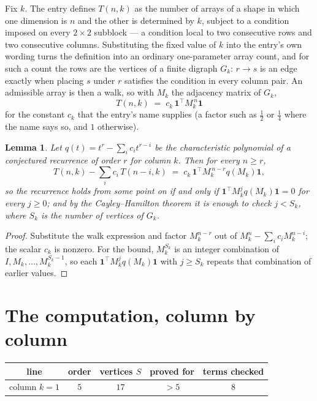 \documentclass[11pt,a4paper]{article}
\theoremstyle{plain}
\newtheorem{lemma}[theorem]{Lemma}
\theoremstyle{definition}
\begin{document}
Fix $k$. The entry defines $T(n,k)$ as the number of arrays of a shape in which one dimension
is $n$ and the other is determined by $k$, subject to a condition imposed on every
$2\times2$ subblock --- a condition local to two consecutive rows and two consecutive columns.
Substituting the fixed value of $k$ into the entry's own wording turns the definition into an
ordinary one-parameter array count, and for such a count the rows are the vertices of a finite
digraph $G_k$: $r\to s$ is an edge exactly when placing $s$ under $r$ satisfies the condition
in every column pair. An admissible array is then a walk, so with $M_k$ the adjacency matrix
of $G_k$,
\[
T(n,k)\;=\;c_k\,\mathbf{1}^{\!\top}M_k^{\,n}\mathbf{1}
\]
for the constant $c_k$ that the entry's name supplies (a factor such as $\tfrac12$ or
$\tfrac14$ where the name says so, and $1$ otherwise).

\begin{lemma}\label{lem:crit}
Let $q(t)=t^{r}-\sum_i c_it^{r-i}$ be the characteristic polynomial of a conjectured
recurrence of order $r$ for column $k$. Then for every $n\ge r$,
\[
T(n,k)-\sum_i c_i\,T(n-i,k)\;=\;c_k\,\mathbf{1}^{\!\top}M_k^{\,n-r}q(M_k)\mathbf{1},
\]
so the recurrence holds from some point on if and only if
$\mathbf{1}^{\!\top}M_k^{j}q(M_k)\mathbf{1}=0$ for every $j\ge0$; and by the
Cayley--Hamilton theorem it is enough to check $j<S_k$, where $S_k$ is the number of vertices
of $G_k$.
\end{lemma}

\begin{proof}
Substitute the walk expression and factor $M_k^{n-r}$ out of $M_k^{n}-\sum_ic_iM_k^{n-i}$;
the scalar $c_k$ is nonzero. For the bound, $M_k^{S_k}$ is an integer combination of
$I,M_k,\dots,M_k^{S_k-1}$, so each $\mathbf{1}^{\!\top}M_k^{j}q(M_k)\mathbf{1}$ with
$j\ge S_k$ repeats that combination of earlier values.
\end{proof}

\section{The computation, column by column}

\begin{center}
\begin{tabular}{ccccc}
line & order & vertices $S$ & proved for & terms checked \\ \hline
column $k$$=1$ & $5$ & $17$ & $>5$ & $8$ \\
\end{tabular}
\end{center}
\end{document}
